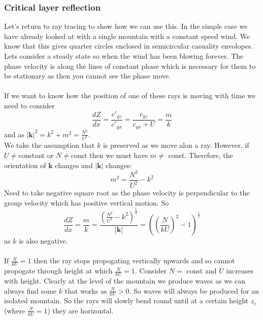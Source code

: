 \documentclass{article}
\begin{document}
\subsubsection{Critical layer reflection}
Let's return to ray tracing to show how we can use this. In the simple case we have already looked at with a single mountain with a constant speed wind. We know that this gives quarter circles enclosed in semicircular casuality envolopes. Lets consider a steady state so when the wind has been blowing forever. The phase velocity is along the lines of constant phase which is necessary for them to be stationary as then you cannot see the phase move.\\\\
If we want to know how the position of one of these rays is moving with time we need to consider
$$
\frac{dZ}{dx} = \frac{c'_{gz}}{c'_{gx}} = \frac{c_{gz}}{c_{gx} + U} = \frac{m}{k}
$$
and as $|\bm k|^2 = k^2 + m^2 = \frac{N^2}{U^2}$.\\
We take the assumption that $k$ is preserved as we move alon a ray. However, if $U \neq $constant or $N \neq $const then we must have $m \neq$ const. Therefore, the orientation of $\bm k$ changes and $|\bm k|$ changes:
$$
m^2 = \frac{N^2}{U^2} - k^2
$$
Need to take negative square root as the phase velocity is perpendicular to the group velocity which has positive vertical motion. So
$$
\frac{dZ}{dx} = \frac{m}{k} = \frac{ ( \frac{N^2}{U^2} - k^2)^{\frac{1}{2}}}{|\bm k|} =  ( (\frac{N}{k U})^2 - 1)^{\frac{1}{2}}
$$
as $k$ is also negative.\\\\
If $\frac{N}{kU} = 1$ then the ray stops propogating vertically upwards and so cannot propogate through height at which $\frac{N}{k U} =1$. Consider $N= $ const and $U$ increases with height. Clearly at the level of the mountain we produce waves as we can always find some $k$ that works as $\frac{N}{k U}> 0$. So waves will always be produced for an isolated mountain. So the rays will slowly bend round until at a certain height $z_c$ (where $\frac{N}{kU} =1$) they are horizontal.\\\\
\end{document}
